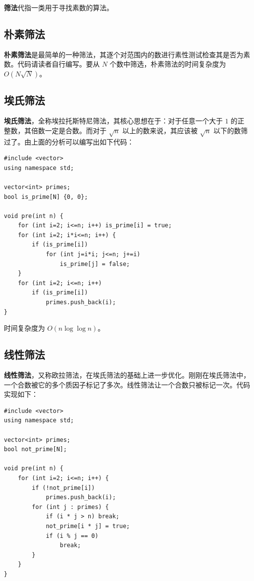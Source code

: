\textbf{筛法}代指一类用于寻找素数的算法。

\subsection{朴素筛法}

\textbf{朴素筛法}是最简单的一种筛法，其逐个对范围内的数进行素性测试检查其是否为素数。代码请读者自行编写。要从 $N$ 个数中筛选，朴素筛法的时间复杂度为 $O(N\sqrt{N})$。

\subsection{埃氏筛法}

\textbf{埃氏筛法}，全称埃拉托斯特尼筛法，其核心思想在于：对于任意一个大于 $1$ 的正整数，其倍数一定是合数。而对于 $\sqrt{n}$ 以上的数来说，其应该被 $\sqrt{n}$ 以下的数筛过了。由上面的分析可以编写出如下代码：

\begin{lstlisting}[caption=埃氏筛法]
#include <vector>
using namespace std;

vector<int> primes;
bool is_prime[N] {0, 0};

void pre(int n) {
    for (int i=2; i<=n; i++) is_prime[i] = true;
    for (int i=2; i*i<=n; i++) {
        if (is_prime[i])
            for (int j=i*i; j<=n; j+=i)
                is_prime[j] = false;
    }
    for (int i=2; i<=n; i++)
        if (is_prime[i])
            primes.push_back(i);
}
\end{lstlisting}

时间复杂度为 $O(n \log \log n)$。

\subsection{线性筛法}

\textbf{线性筛法}，又称欧拉筛法，在埃氏筛法的基础上进一步优化。刚刚在埃氏筛法中，一个合数被它的多个质因子标记了多次。线性筛法让一个合数只被标记一次。代码实现如下：

\begin{lstlisting}[caption=线性筛法]
#include <vector>
using namespace std;

vector<int> primes;
bool not_prime[N];

void pre(int n) {
    for (int i=2; i<=n; i++) {
        if (!not_prime[i])
            primes.push_back(i);
        for (int j : primes) {
            if (i * j > n) break;
            not_prime[i * j] = true;
            if (i % j == 0)
                break;
        }
    }
}
\end{lstlisting}


